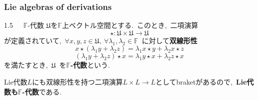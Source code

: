 \documentclass[uplatex,dvipdfmx]{jsarticle}
\begin{document}
\subsubsection{Lie algebras of derivations}
\begin{mydef}{1.5~~~$\mathbb{F}$-代数}
    $\mathfrak{U}$を$\mathbb{F}$上ベクトル空間とする.~このとき,~二項演算
    \begin{equation*}
        \star:\mathfrak{U}\times \mathfrak{U}\to \mathfrak{U}
    \end{equation*}
    が定義されていて,~$\forall x,y,z\in \mathfrak{U},~\forall\lambda_1,\lambda_2 \in \mathbb{F}$~に対して\textbf{双線形性}
    \begin{equation*}
        x\star(\lambda_1 y + \lambda_2 z)=\lambda_1x\star y + \lambda_2 x\star z
    \end{equation*}
    \begin{equation*}
        (\lambda_1 y + \lambda_2 z)\star x=\lambda_1y\star x + \lambda_2 z\star x
    \end{equation*}
    を満たすとき,~$\mathfrak{U}$~を\textbf{$\mathbb{F}$-代数}という.
\end{mydef}
Lie代数$L$にも双線形性を持つ二項演算$L\times L\to L$としてbraketがあるので,~\textbf{Lie代数も$\mathbb{F}$-代数}である.
\end{document}
